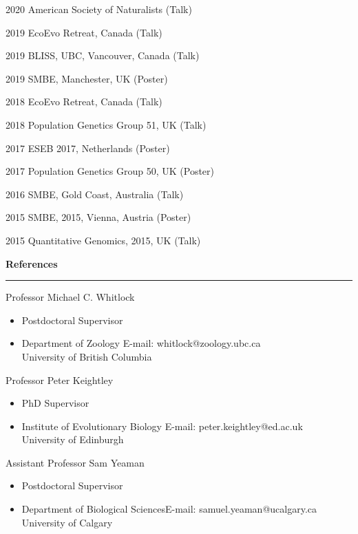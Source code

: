 \documentclass[11pt]{article}
\newcommand{\makeheadingGeneric}[2][]%
        {\hspace*{-\marginparsep minus \marginparwidth}%
         \begin{minipage}[t]{\textwidth+\marginparwidth+\marginparsep}%
             {\large \bfseries #2 \hfill #1}\\[-0.15\baselineskip]%
                 \rule{\columnwidth}{1pt}%
         \end{minipage}}
\newenvironment{innerlist}[1][\enskip\textbullet]%
        {\begin{itemize}[#1,leftmargin=*,parsep=0pt,itemsep=0pt,topsep=0pt,partopsep=0pt]}
        {\end{itemize}}
\newcommand{\blankline}{\quad\pagebreak[2]}
\newcommand{\halfblankline}{\quad\vspace{-0.3\baselineskip}\pagebreak[2]}
\begin{document}
2020 \quad American Society of Naturalists (Talk) 

2019 \quad EcoEvo Retreat, Canada (Talk)

2019 \quad BLISS, UBC, Vancouver, Canada (Talk) 

2019 \quad SMBE, Manchester, UK (Poster)

2018 \quad EcoEvo Retreat, Canada (Talk)

2018 \quad Population Genetics Group 51, UK (Talk)

2017 \quad ESEB 2017, Netherlands (Poster)

2017 \quad Population Genetics Group 50, UK (Poster) 

2016 \quad SMBE, Gold Coast, Australia (Talk)

2015 \quad SMBE, 2015, Vienna, Austria (Poster) 

2015 \quad Quantitative Genomics, 2015, UK (Talk)

\newpage
	

\makeheadingGeneric{References}

\blankline

Professor Michael C. Whitlock
\begin{innerlist}
\item[] Postdoctoral Supervisor
\item[] Department of Zoology \hfill{E-mail: whitlock@zoology.ubc.ca}\\
University of British Columbia 
\end{innerlist}

\halfblankline

Professor Peter Keightley
\begin{innerlist}
\item[] PhD Supervisor
\item[]  Institute of Evolutionary Biology \hfill{E-mail: peter.keightley@ed.ac.uk}\\
University of Edinburgh
\end{innerlist}

\halfblankline

Assistant Professor Sam Yeaman
\begin{innerlist}
\item[] Postdoctoral Supervisor
\item[]   Department of Biological Sciences\hfill{E-mail: samuel.yeaman@ucalgary.ca}\\
University of Calgary
\end{innerlist}
\end{document}
